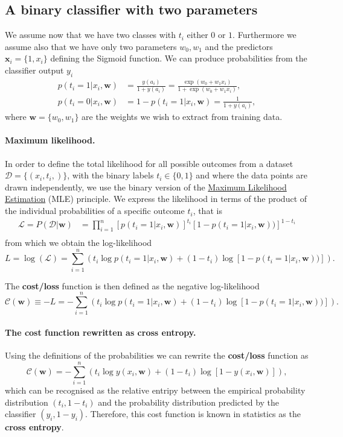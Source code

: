 \documentclass[%
oneside,                 %
final,                   %
10pt]{article}
\begin{document}
\subsection{A binary classifier with two parameters}

We assume now that we have two classes with $t_i$ either $0$ or $1$. Furthermore we assume also that we have only two parameters $w_0, w_1$ and the predictors $\boldsymbol{x}_i = \{ 1, x_i \}$ defining the Sigmoid function. We can produce probabilities from the classifier output $y_i$
\begin{align*}
p(t_i=1|x_i,\boldsymbol{w}) &= \frac{y(a_i)}{1 + y(a_i)} = \frac{\exp{(w_0+w_1x_i)}}{1+\exp{(w_0+w_1x_i)}},\nonumber\\
p(t_i=0|x_i,\boldsymbol{w}) &= 1 - p(t_i=1|x_i,\boldsymbol{w}) = \frac{1}{1 + y(a_i)} ,
\end{align*}
where $\boldsymbol{w} = \{ w_0, w_1\}$ are the weights we wish to extract from training data. 

\paragraph{Maximum likelihood.}
In order to define the total likelihood for all possible outcomes from a  
dataset $\mathcal{D}=\{(x_i, t_i,)\}$, with the binary labels
$t_i\in\{0,1\}$ and where the data points are drawn independently, we use the binary version of the \href{{https://en.wikipedia.org/wiki/Maximum_likelihood_estimation}}{Maximum Likelihood Estimation} (MLE) principle. 
We express the 
likelihood in terms of the product of the individual probabilities of a specific outcome $t_i$, that is 
\begin{align*}
\mathcal{L} = P(\mathcal{D}|\boldsymbol{w})& = \prod_{i=1}^n \left[p(t_i=1|x_i,\boldsymbol{w})\right]^{t_i}\left[1-p(t_i=1|x_i,\boldsymbol{w}))\right]^{1-t_i}\nonumber \\
\end{align*}
from which we obtain the log-likelihood 
\[
L = \log(\mathcal{L}) = \sum_{i=1}^n \left( t_i\log{p(t_i=1|x_i,\boldsymbol{w})} + (1-t_i)\log\left[1-p(t_i=1|x_i,\boldsymbol{w}))\right]\right).
\]

The \textbf{cost/loss} function is then defined as the negative log-likelihood
\[
\mathcal{C}(\boldsymbol{w}) \equiv -L = -\sum_{i=1}^n \left( t_i\log{p(t_i=1|x_i,\boldsymbol{w})} + (1-t_i)\log\left[1-p(t_i=1|x_i,\boldsymbol{w}))\right]\right).
\]

\paragraph{The cost function rewritten as cross entropy.}
Using the definitions of the probabilities we can rewrite the \textbf{cost/loss} function as
\[
\mathcal{C}(\boldsymbol{w}) = -\sum_{i=1}^n \left( t_i\log{ y(x_i,\boldsymbol{w})} + (1-t_i)\log\left[ 1-y( x_i,\boldsymbol{w}) \right] \right),
\]
which can be recognised as the relative entripy between the empirical probability distribution $(t_i, 1-t_i)$ and the probability distribution predicted by the classifier $(y_i, 1-y_i)$.
Therefore, this cost function is known in statistics as the \textbf{cross entropy}. 
\end{document}
